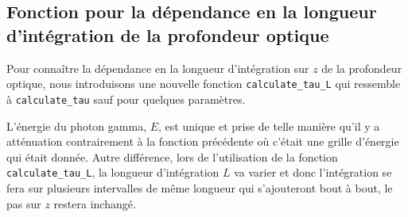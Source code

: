 \documentclass[a4paper,12pt,twoside]{article}
\newcommand{\nocontentsline}[3]{}
\newcommand{\tocless}[2]{\bgroup\let\addcontentsline=\nocontentsline#1{#2}\egroup}
\begin{document}
\begin{appendices}
\tocless\section{Fonction pour la dépendance en la longueur d'intégration de la profondeur optique}

Pour connaître la dépendance en la longueur d'intégration sur $z$ de la profondeur optique, nous introduisons une nouvelle fonction \texttt{calculate\_tau\_L} qui ressemble à \texttt{calculate\_tau} sauf pour quelques paramètres.

L'énergie du photon gamma, $E$, est unique et prise de telle manière qu'il y a atténuation contrairement à la fonction précédente où c'était une grille d'énergie qui était donnée. Autre différence, lors de l'utilisation de la fonction \texttt{calculate\_tau\_L}, la longueur d'intégration $L$ va varier et donc l'intégration se fera sur plusieurs intervalles de même longueur qui s'ajouteront bout à bout, le pas sur $z$ restera inchangé.

\end{appendices}
\end{document}
